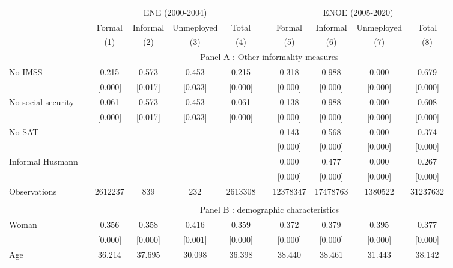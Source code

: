 \begin{tabular}{lrccccccccc}
\toprule
      &       & \multicolumn{4}{c}{ENE (2000-2004)} &       & \multicolumn{4}{c}{ENOE (2005-2020)} \\
\cmidrule{3-6}\cmidrule{8-11}      &       & Formal & Informal & Unmeployed & Total &       & Formal & Informal & Unmeployed & Total \\
\midrule
\midrule
      &       & (1)   & (2)   & (3)   & (4)   &       & (5)   & (6)   & (7)   & (8) \\
\midrule
      &       & \multicolumn{9}{c}{Panel A : Other informality measures} \\
\midrule
\midrule
No IMSS &       & 0.215 & 0.573 & 0.453 & 0.215 &       & 0.318 & 0.988 & 0.000 & 0.679 \\
      &       & [0.000] & [0.017] & [0.033] & [0.000] &       & [0.000] & [0.000] & [0.000] & [0.000] \\
No social security &       & 0.061 & 0.573 & 0.453 & 0.061 &       & 0.138 & 0.988 & 0.000 & 0.608 \\
      &       & [0.000] & [0.017] & [0.033] & [0.000] &       & [0.000] & [0.000] & [0.000] & [0.000] \\
No SAT &       &       &       &       &       &       & 0.143 & 0.568 & 0.000 & 0.374 \\
      &       &       &       &       &       &       & [0.000] & [0.000] & [0.000] & [0.000] \\
Informal Husmann &       &       &       &       &       &       & 0.000 & 0.477 & 0.000 & 0.267 \\
      &       &       &       &       &       &       & [0.000] & [0.000] & [0.000] & [0.000] \\
\midrule
Observations &       & 2612237 & 839   & 232   & 2613308 &       & 12378347 & 17478763 & 1380522 & 31237632 \\
\midrule
\midrule
      &       &       &       &       &       &       &       &       &       &  \\
\midrule
      &       & \multicolumn{9}{c}{Panel B : demographic characteristics} \\
\midrule
\midrule
Woman &       & 0.356 & 0.358 & 0.416 & 0.359 &       & 0.372 & 0.379 & 0.395 & 0.377 \\
      &       & [0.000] & [0.000] & [0.001] & [0.000] &       & [0.000] & [0.000] & [0.000] & [0.000] \\
Age   &       & 36.214 & 37.695 & 30.098 & 36.398 &       & 38.440 & 38.461 & 31.443 & 38.142 \\

\end{tabular}
